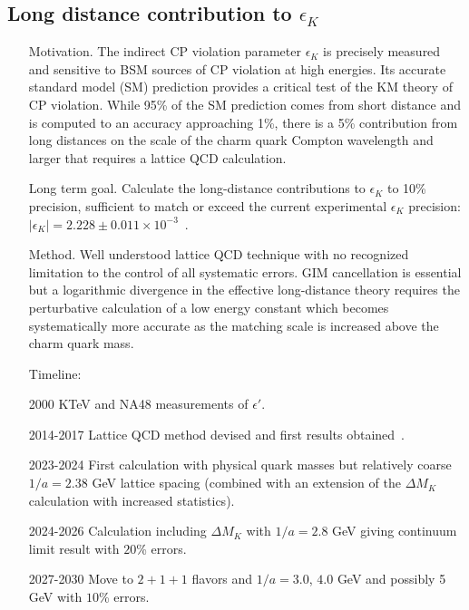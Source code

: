 \documentclass[prd,showpacs,showkeys,preprintnumbers,floatfix,
nofootinbib%
]{revtex4-2}
\begin{document}
\subsection{Long distance contribution to $\epsilon_K$}
\begin{itemize}
    \item[Motivation.] The indirect CP violation parameter $\epsilon_K$ is precisely 
    measured and sensitive to BSM sources of CP violation at high energies. Its 
    accurate standard model (SM) prediction provides a critical test of the KM 
    theory of CP violation.  While 95\% of the SM prediction comes from short 
    distance and is computed to an accuracy approaching 1\%, there is a 5\% 
    contribution from long distances on the scale of the charm quark Compton 
    wavelength and larger that requires a lattice QCD calculation.
    \item[Long term goal.] Calculate the long-distance contributions to $\epsilon_K$ 
    to 10\% precision, sufficient to match or exceed the current experimental 
    $\epsilon_K$ precision: $|\epsilon_K|=2.228\pm 0.011 \times 10^{-3}$~\cite{ParticleDataGroup:2022pth}.
    \item[Method.] Well understood lattice QCD technique with no recognized 
    limitation to the control of all systematic errors. GIM cancellation is essential 
    but a logarithmic divergence in the effective long-distance theory requires the 
    perturbative calculation of a low energy constant which becomes systematically 
    more accurate as the matching scale is increased above the charm quark mass.
\item[Timeline:]
    \item[2000] KTeV and NA48 measurements of $\epsilon'$.
    \item[2014-2017] Lattice QCD method devised and first results 
    obtained~\cite{Christ:2015phf}. 
    \item[2023-2024] First calculation with physical quark masses but relatively 
    coarse $1/a=2.38$ GeV lattice spacing (combined with an extension of the
    $\Delta M_K$ calculation with increased statistics).
    \item[2024-2026] Calculation including $\Delta M_K$ with $1/a = 2.8$ GeV 
    giving continuum limit result with $20$\% errors. 
    \item[2027-2030] Move to $2+1+1$ flavors and $1/a = 3.0$, $4.0$
    GeV and possibly 5 GeV with $10$\% errors. 
\end{itemize}
\end{document}
